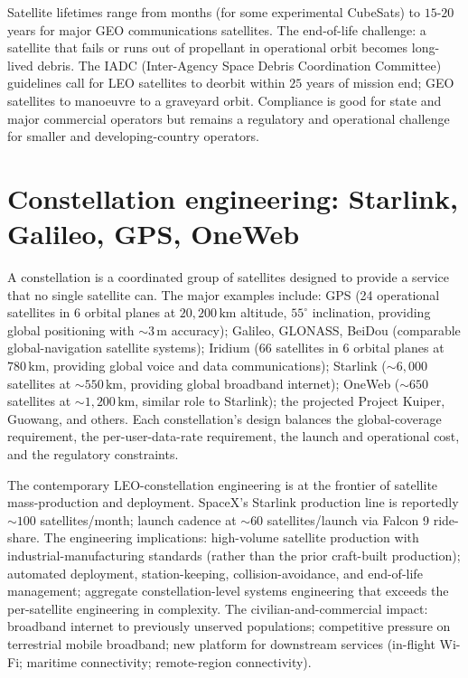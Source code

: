 Satellite lifetimes range from months (for some experimental CubeSats) to $15$-$20$ years for major GEO communications satellites. The end-of-life challenge: a satellite that fails or runs out of propellant in operational orbit becomes long-lived debris. The IADC (Inter-Agency Space Debris Coordination Committee) guidelines call for LEO satellites to deorbit within $25$ years of mission end; GEO satellites to manoeuvre to a graveyard orbit. Compliance is good for state and major commercial operators but remains a regulatory and operational challenge for smaller and developing-country operators.

\section{Constellation engineering: Starlink, Galileo, GPS, OneWeb}

A constellation is a coordinated group of satellites designed to provide a service that no single satellite can. The major examples include: GPS (24 operational satellites in $6$ orbital planes at $20{,}200\,\text{km}$ altitude, $55^{\circ}$ inclination, providing global positioning with $\sim 3\,\text{m}$ accuracy); Galileo, GLONASS, BeiDou (comparable global-navigation satellite systems); Iridium (66 satellites in $6$ orbital planes at $780\,\text{km}$, providing global voice and data communications); Starlink ($\sim 6{,}000$ satellites at $\sim 550\,\text{km}$, providing global broadband internet); OneWeb ($\sim 650$ satellites at $\sim 1{,}200\,\text{km}$, similar role to Starlink); the projected Project Kuiper, Guowang, and others. Each constellation's design balances the global-coverage requirement, the per-user-data-rate requirement, the launch and operational cost, and the regulatory constraints.

The contemporary LEO-constellation engineering is at the frontier of satellite mass-production and deployment. SpaceX's Starlink production line is reportedly $\sim 100$ satellites/month; launch cadence at $\sim 60$ satellites/launch via Falcon 9 ride-share. The engineering implications: high-volume satellite production with industrial-manufacturing standards (rather than the prior craft-built production); automated deployment, station-keeping, collision-avoidance, and end-of-life management; aggregate constellation-level systems engineering that exceeds the per-satellite engineering in complexity. The civilian-and-commercial impact: broadband internet to previously unserved populations; competitive pressure on terrestrial mobile broadband; new platform for downstream services (in-flight Wi-Fi; maritime connectivity; remote-region connectivity).

